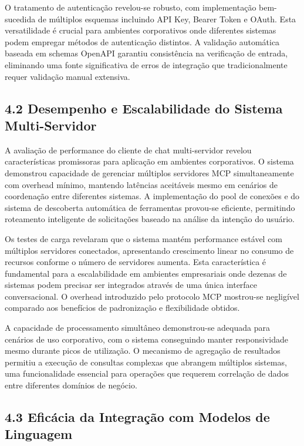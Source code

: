\documentclass[
]{article}
\begin{document}
O tratamento de autenticação revelou-se robusto, com implementação
bem-sucedida de múltiplos esquemas incluindo API Key, Bearer Token e
OAuth. Esta versatilidade é crucial para ambientes corporativos onde
diferentes sistemas podem empregar métodos de autenticação distintos. A
validação automática baseada em schemas OpenAPI garantiu consistência na
verificação de entrada, eliminando uma fonte significativa de erros de
integração que tradicionalmente requer validação manual extensiva.

\subsection{4.2 Desempenho e Escalabilidade do Sistema
Multi-Servidor}\label{desempenho-e-escalabilidade-do-sistema-multi-servidor}

A avaliação de performance do cliente de chat multi-servidor revelou
características promissoras para aplicação em ambientes corporativos. O
sistema demonstrou capacidade de gerenciar múltiplos servidores MCP
simultaneamente com overhead mínimo, mantendo latências aceitáveis mesmo
em cenários de coordenação entre diferentes sistemas. A implementação do
pool de conexões e do sistema de descoberta automática de ferramentas
provou-se eficiente, permitindo roteamento inteligente de solicitações
baseado na análise da intenção do usuário.

Os testes de carga revelaram que o sistema mantém performance estável
com múltiplos servidores conectados, apresentando crescimento linear no
consumo de recursos conforme o número de servidores aumenta. Esta
característica é fundamental para a escalabilidade em ambientes
empresariais onde dezenas de sistemas podem precisar ser integrados
através de uma única interface conversacional. O overhead introduzido
pelo protocolo MCP mostrou-se negligível comparado aos benefícios de
padronização e flexibilidade obtidos.

A capacidade de processamento simultâneo demonstrou-se adequada para
cenários de uso corporativo, com o sistema conseguindo manter
responsividade mesmo durante picos de utilização. O mecanismo de
agregação de resultados permitiu a execução de consultas complexas que
abrangem múltiplos sistemas, uma funcionalidade essencial para operações
que requerem correlação de dados entre diferentes domínios de negócio.

\subsection{4.3 Eficácia da Integração com Modelos de
Linguagem}\label{eficuxe1cia-da-integrauxe7uxe3o-com-modelos-de-linguagem}
\end{document}

